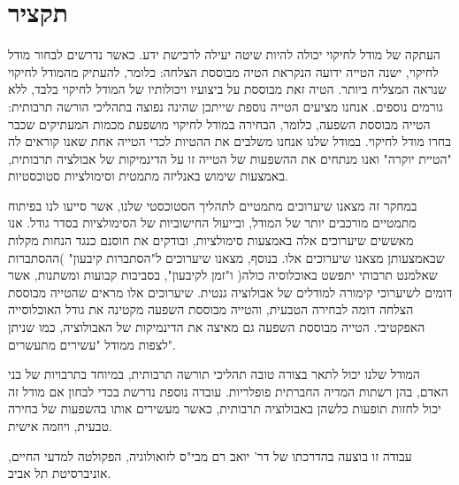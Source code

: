 \documentclass{article}
\begin{document}
\pagestyle{empty}

\section*{תקציר}
העתקה של מודל לחיקוי יכולה להיות שיטה יעילה לרכישת ידע. כאשר נדרשים לבחור מודל לחיקוי, ישנה הטייה ידועה הנקראת הטיה מבוססת הצלחה: כלומר, להעתיק מהמודל לחיקוי שנראה המצליח ביותר. הטיה זאת מבוססת על ביצועיו ויכולותיו של המודל לחיקוי בלבד, ללא גורמים נוספים. אנחנו מציעים הטייה נוספת שייתכן שהינה נפוצה בתהליכי הורשה תרבותית: הטייה מבוססת השפעה, כלומר, הבחירה במודל לחיקוי מושפעת מכמות המעתיקים שכבר בחרו מודל לחיקוי. במודל שלנו אנחנו משלבים את ההטיות לכדי הטייה אחת שאנו קוראים לה "הטיית יוקרה" ואנו מנתחים את ההשפעות של הטייה זו על הדינמיקות של אבולציה תרבותית, באמצעות שימוש באנליזה מתמטית וסימולציות סטוכסטיות.

במחקר זה מצאנו שיערוכים מתמטיים לתהליך הסטוכסטי שלנו, אשר סייעו לנו בפיתוח מתמטיים מורכבים יותר של המודל, ובייעול החישוביות של הסימולציות בסדר גודל. אנו מאששים שיערוכים אלה באמצעות סימולציות, ובודקים את חוסנם כנגד הנחות מקלות שבאמצעותן מצאנו שיערוכים אלו.
בנוסף, מצאנו שיערוכים ל"הסתברות קיבעון" )ההסתברות שאלמנט תרבותי יתפשט באוכלוסיה כולה( ו"זמן לקיבעון", בסביבות קבועות ומשתנות, אשר דומים לשיערוכי קימורה למודלים של אבולוציה גנטית.
שיערוכים אלו מראים שהטייה מבוססת הצלחה דומה לבחירה הטבעית, והטייה מבוססת השפעה מקטינה את גודל האוכלוסייה האפקטיבי.
הטייה מבוססת השפעה גם מאיצה את הדינמיקות של האבולוציה, כמו שניתן לצפות ממודל "עשירים מתעשרים". 

המודל שלנו יכול לתאר בצורה טובה תהליכי תורשה תרבותית, במיוחד בתרבויות של בני האדם, בהן רשתות המדיה החברתית פופלריות. עובדה נוספת נדרשת בכדי לבחון אם מודל זה יכול לחזות תופעות כלשהן באבולוציה תרבותית, כאשר מעשירים אותו בהשפעות של בחירה טבעית, ויוזמה אישית.

\pagebreak

עבודה זו בוצעה בהדרכתו של דר' יואב רם מבי"ס לזואולוגיה, הפקולטה למדעי החיים, אוניברסיטת תל אביב.
\end{document}
